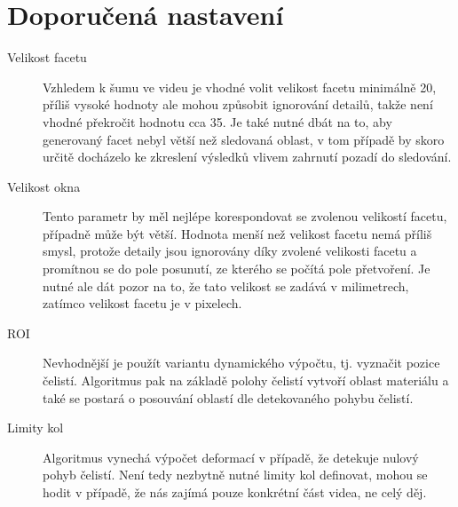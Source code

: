 \documentclass[a4paper,12pt]{article}
\begin{document}
\section{Doporučená nastavení}
\label{sec:goodSettings}
\begin{description}
\item[Velikost facetu] Vzhledem k šumu ve videu je vhodné volit velikost facetu minimálně 20, příliš vysoké hodnoty ale mohou způsobit ignorování detailů, takže není vhodné překročit hodnotu cca 35. Je také nutné dbát na to, aby generovaný facet nebyl větší než sledovaná oblast, v tom případě by skoro určitě docházelo ke zkreslení výsledků vlivem zahrnutí pozadí do sledování.
\item[Velikost okna] Tento parametr by měl nejlépe korespondovat se zvolenou velikostí facetu, případně může být větší. Hodnota menší než velikost facetu nemá příliš smysl, protože detaily jsou ignorovány díky zvolené velikosti facetu a promítnou se do pole posunutí, ze kterého se počítá pole přetvoření. Je nutné ale dát pozor na to, že tato velikost se zadává v milimetrech, zatímco velikost facetu je v pixelech.
\item[ROI] Nevhodnější je použít variantu dynamického výpočtu, tj. vyznačit pozice čelistí. Algoritmus pak na základě polohy čelistí vytvoří oblast materiálu a také se postará o posouvání oblastí dle detekovaného pohybu čelistí. 
\item[Limity kol] Algoritmus vynechá výpočet deformací v případě, že detekuje nulový pohyb čelistí. Není tedy nezbytně nutné limity kol definovat, mohou se hodit v případě, že nás zajímá pouze konkrétní část videa, ne celý děj.
\end{description}
\newpage
\end{document}
